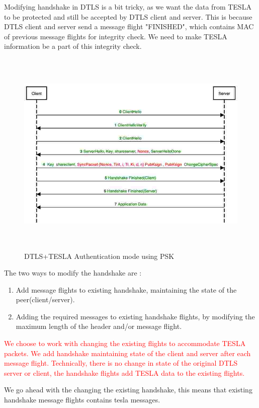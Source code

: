 Modifying handshake in DTLS is a bit tricky, as we want the data from TESLA to be protected and still be accepted by DTLS client and server. This is because DTLS client and server send a message flight "FINISHED", which contains MAC of previous message flights for integrity check. We need to make TESLA information be a part of this integrity check. \cite{tls-byte-explained}

 \begin{figure}[H]
    \centering
    \includegraphics[height=10cm,width=16cm]{figures/hs.jpg}
    \caption{DTLS+TESLA Authentication mode using PSK}
    \label{hs}
\end{figure}
    

The two ways to modify the handshake are :
\begin{enumerate}
    \item Add message flights to existing handshake, maintaining the state of the peer(client/server).
    \item Adding the required messages to existing handshake flights, by modifying the maximum length of the header and/or message flight.
\end{enumerate}  


\textcolor{red}{We choose to work with changing the existing flights to accommodate TESLA packets. We add handshake maintaining state of the client and server after each message flight. Technically, there is no change in state of the original DTLS server or client, the handshake flights add TESLA data to the existing flights. }

We go ahead with the changing the existing handshake, this means that existing handshake message flights contains tesla messages.

